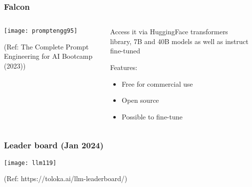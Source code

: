 \begin{frame}[fragile]\frametitle{Falcon}


\begin{columns}
    \begin{column}[T]{0.6\linewidth}
		\begin{center}
		\texttt{[image: promptengg95]}

		{\tiny (Ref: The Complete Prompt Engineering for AI Bootcamp (2023))}
		\end{center}	
    \end{column}
    \begin{column}[T]{0.4\linewidth}
		Access it via HuggingFace transformers library, 
		7B and 40B models as well as instruct fine-tuned
		
		Features:
		\begin{itemize}
		\item Free for commercial use
		\item Open source
		\item Possible to fine-tune
		\end{itemize}	 

    \end{column}
  \end{columns}
\end{frame}






\begin{frame}[fragile]\frametitle{Leader board (Jan 2024)}


		\begin{center}

		
		\texttt{[image: llm119]}
		
		{\tiny (Ref: https://toloka.ai/llm-leaderboard/)}
		\end{center}	

\end{frame}

